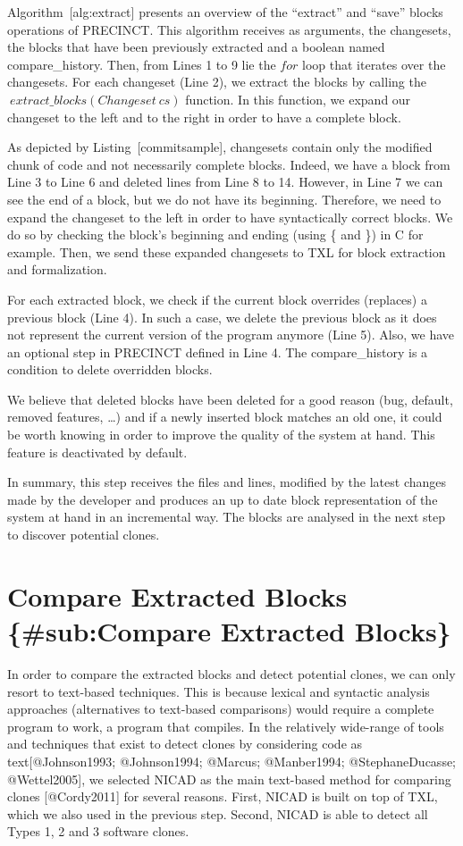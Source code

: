 Algorithm~{[}alg:extract{]} presents an overview of the ``extract'' and
``save'' blocks operations of PRECINCT. This algorithm receives as
arguments, the changesets, the blocks that have been previously
extracted and a boolean named compare\_history. Then, from Lines 1 to 9
lie the \(for\) loop that iterates over the changesets. For each
changeset (Line 2), we extract the blocks by calling the
\(~extract\_blocks(Changeset~cs)\) function. In this function, we expand
our changeset to the left and to the right in order to have a complete
block.

As depicted by Listing~{[}commitsample{]}, changesets contain only the
modified chunk of code and not necessarily complete blocks. Indeed, we
have a block from Line 3 to Line 6 and deleted lines from Line 8 to 14.
However, in Line 7 we can see the end of a block, but we do not have its
beginning. Therefore, we need to expand the changeset to the left in
order to have syntactically correct blocks. We do so by checking the
block's beginning and ending (using \{ and \}) in C for example. Then,
we send these expanded changesets to TXL for block extraction and
formalization.

For each extracted block, we check if the current block overrides
(replaces) a previous block (Line 4). In such a case, we delete the
previous block as it does not represent the current version of the
program anymore (Line 5). Also, we have an optional step in PRECINCT
defined in Line 4. The compare\_history is a condition to delete
overridden blocks.

We believe that deleted blocks have been deleted for a good reason (bug,
default, removed features, \ldots{}) and if a newly inserted block
matches an old one, it could be worth knowing in order to improve the
quality of the system at hand. This feature is deactivated by default.

In summary, this step receives the files and lines, modified by the
latest changes made by the developer and produces an up to date block
representation of the system at hand in an incremental way. The blocks
are analysed in the next step to discover potential clones.

\section{Compare Extracted Blocks \{\#sub:Compare Extracted
Blocks\}}\label{compare-extracted-blocks-subcompare-extracted-blocks}

In order to compare the extracted blocks and detect potential clones, we
can only resort to text-based techniques. This is because lexical and
syntactic analysis approaches (alternatives to text-based comparisons)
would require a complete program to work, a program that compiles. In
the relatively wide-range of tools and techniques that exist to detect
clones by considering code as text{[}@Johnson1993; @Johnson1994;
@Marcus; @Manber1994; @StephaneDucasse; @Wettel2005{]}, we selected
NICAD as the main text-based method for comparing clones
{[}@Cordy2011{]} for several reasons. First, NICAD is built on top of
TXL, which we also used in the previous step. Second, NICAD is able to
detect all Types 1, 2 and 3 software clones.

